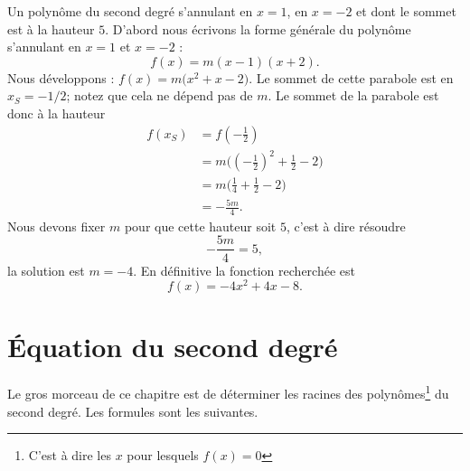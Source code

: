 \begin{example}
    Un polynôme du second degré s'annulant en \( x=1\), en \( x=-2\) et dont le sommet est à la hauteur \( 5\). D'abord nous écrivons la forme générale du polynôme s'annulant en \( x=1\) et \( x=-2\) :
    \begin{equation}
        f(x)=m(x-1)(x+2).
    \end{equation}
    Nous développons : \( f(x)=m\big( x^2+x-2 \big)\). Le sommet de cette parabole est en \( x_S=-1/2\); notez que cela ne dépend pas de \( m\). Le sommet de la parabole est donc à la hauteur
    \begin{subequations}
        \begin{align}
            f(x_S)&=f\left( -\frac{ 1 }{2} \right)\\
            &=m\Big( \left( -\frac{ 1 }{2} \right)^2+\frac{ 1 }{2}-2 \Big)\\
            &=m\Big( \frac{1}{ 4 }+\frac{1}{ 2 }-2 \Big)\\
            &=-\frac{ 5m }{ 4 }.
        \end{align}
    \end{subequations}
    Nous devons fixer \( m\) pour que cette hauteur soit \( 5\), c'est à dire résoudre
    \begin{equation}
        -\frac{ 5m }{ 4 }=5,
    \end{equation}
    la solution est \( m=-4\). En définitive la fonction recherchée est
    \begin{equation}
        f(x)=-4x^2+4x-8.
    \end{equation}
\end{example}

\section{Équation du second degré}

Le gros morceau de ce chapitre est de déterminer les racines des polynômes\footnote{C'est à dire les \( x\) pour lesquels \( f(x)=0\)} du second degré. Les formules sont les suivantes.

